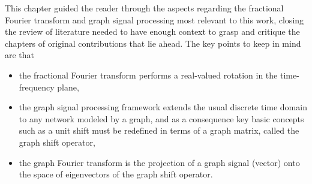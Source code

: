 This chapter guided the reader through the aspects regarding the fractional Fourier transform and graph signal processing most relevant to this work, closing the review of literature needed to have enough context to grasp and critique the chapters of original contributions that lie ahead. The key points to keep in mind are that
\begin{itemize}[noitemsep]
\item the fractional Fourier transform performs a real-valued rotation in the time-frequency plane,
\item the graph signal processing framework extends the usual discrete time domain to any network modeled by a graph, and as a consequence key basic concepts such as a unit shift must be redefined in terms of a graph matrix, called the graph shift operator,
\item the graph Fourier transform is the projection of a graph signal (vector) onto the space of eigenvectors of the graph shift operator.
\end{itemize}